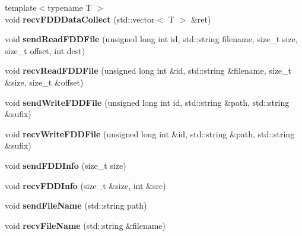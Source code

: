 \begin{DoxyCompactItemize}
\item 
\hypertarget{classfaster_1_1fastComm_a99d64fc5917eb51878e48aa0b16e7cf2}{}\label{classfaster_1_1fastComm_a99d64fc5917eb51878e48aa0b16e7cf2} 
{\footnotesize template$<$typename T $>$ }\\void {\bfseries recv\+F\+D\+D\+Data\+Collect} (std\+::vector$<$ T $>$ \&ret)
\item 
\hypertarget{classfaster_1_1fastComm_a1235a0aea1570313416b46b5f73ca2c0}{}\label{classfaster_1_1fastComm_a1235a0aea1570313416b46b5f73ca2c0} 
void {\bfseries send\+Read\+F\+D\+D\+File} (unsigned long int id, std\+::string filename, size\+\_\+t size, size\+\_\+t offset, int dest)
\item 
\hypertarget{classfaster_1_1fastComm_aa6a698ffe5a0f0d37e6b3fb7b8c5d3c4}{}\label{classfaster_1_1fastComm_aa6a698ffe5a0f0d37e6b3fb7b8c5d3c4} 
void {\bfseries recv\+Read\+F\+D\+D\+File} (unsigned long int \&id, std\+::string \&filename, size\+\_\+t \&size, size\+\_\+t \&offset)
\item 
\hypertarget{classfaster_1_1fastComm_a8ccb090bf59c74033cbd48530c33d485}{}\label{classfaster_1_1fastComm_a8ccb090bf59c74033cbd48530c33d485} 
void {\bfseries send\+Write\+F\+D\+D\+File} (unsigned long int id, std\+::string \&path, std\+::string \&sufix)
\item 
\hypertarget{classfaster_1_1fastComm_a39577ef14e5c84b6b205f82c91c3700c}{}\label{classfaster_1_1fastComm_a39577ef14e5c84b6b205f82c91c3700c} 
void {\bfseries recv\+Write\+F\+D\+D\+File} (unsigned long int \&id, std\+::string \&path, std\+::string \&sufix)
\item 
\hypertarget{classfaster_1_1fastComm_a512e3c2324c15ba73df64f4607e0b064}{}\label{classfaster_1_1fastComm_a512e3c2324c15ba73df64f4607e0b064} 
void {\bfseries send\+F\+D\+D\+Info} (size\+\_\+t size)
\item 
\hypertarget{classfaster_1_1fastComm_aff3221fe657da542999b25ab17b7bc1b}{}\label{classfaster_1_1fastComm_aff3221fe657da542999b25ab17b7bc1b} 
void {\bfseries recv\+F\+D\+D\+Info} (size\+\_\+t \&size, int \&src)
\item 
\hypertarget{classfaster_1_1fastComm_a223bdb317bbccd9893e45ceba38b6ff4}{}\label{classfaster_1_1fastComm_a223bdb317bbccd9893e45ceba38b6ff4} 
void {\bfseries send\+File\+Name} (std\+::string path)
\item 
\hypertarget{classfaster_1_1fastComm_a9ea4e90af01c600cdc730172ba5dc168}{}\label{classfaster_1_1fastComm_a9ea4e90af01c600cdc730172ba5dc168} 
void {\bfseries recv\+File\+Name} (std\+::string \&filename)
\item 

\end{DoxyCompactItemize}
